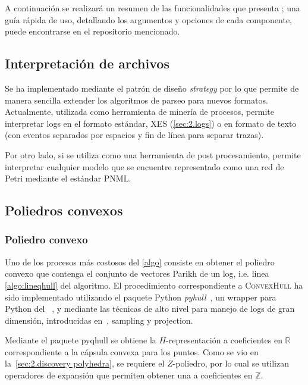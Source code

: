 A continuación se realizará un resumen de las funcionalidades que presenta \pachtool;
una guía rápida de uso, detallando los argumentos y opciones de cada componente,
puede encontrarse en el repositorio mencionado.

\subsection{Interpretación de archivos}
\label{sec:4.parsing}

Se ha implementado mediante el patrón de diseño \textit{strategy} por lo que permite
de manera sencilla extender los algoritmos de parseo para nuevos formatos.
Actualmente, utilizada como herramienta de minería de procesos, permite interpretar 
logs en el formato estándar, XES (\autoref{sec:2.logs}) o en formato de texto (con eventos
separados por espacios y fin de línea para separar trazas).

Por otro lado, si se utiliza \pachtool como una herramienta de post procesamiento, 
permite interpretar cualquier modelo que se encuentre representado
como una red de Petri mediante el estándar PNML.

\subsection{Poliedros convexos}
\label{sec:4.convex_polyhedra}


\subsubsection{Poliedro convexo}
\label{sec:4.qhull}

Uno de los procesos más costosos del \autoref{algo} consiste en obtener el poliedro convexo que contenga 
el conjunto de vectores Parikh de un log, i.e. linea \ref{algo:lineqhull} del algoritmo.
El procedimiento correspondiente a \textsc{ConvexHull} ha sido implementado utilizando el paquete Python \emph{pyhull}~\cite{pyhull}, 
un wrapper para Python del \qhulltool~\cite{Barber96}, y mediante las técnicas de alto nivel para manejo de 
logs de gran dimensión, introducidas en~\cite{CarmonaC14}, sampling y projection.

Mediante el paquete pyqhull se obtiene la $H$-representación a coeficientes en $\mathbb{R}$ correspondiente a la cápsula convexa
para los puntos. Como se vio en la~\autoref{sec:2.discovery polyhedra}, se requiere el $Z$-poliedro,
por lo cual se utilizan operadores de expansión que permiten obtener una  a coeficientes en $\mathbb{Z}$.

